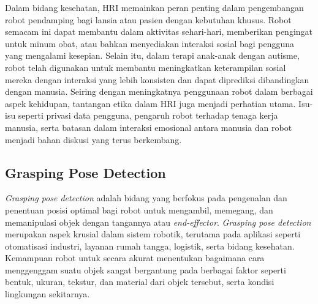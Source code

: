 Dalam bidang kesehatan, HRI memainkan peran penting dalam pengembangan robot pendamping bagi lansia atau pasien dengan kebutuhan khusus.
Robot semacam ini dapat membantu dalam aktivitas sehari-hari, memberikan pengingat untuk minum obat, atau bahkan menyediakan interaksi
sosial bagi pengguna yang mengalami kesepian. Selain itu, dalam terapi anak-anak dengan autisme, robot telah digunakan untuk membantu
meningkatkan keterampilan sosial mereka dengan interaksi yang lebih konsisten dan dapat diprediksi dibandingkan dengan manusia.  
Seiring dengan meningkatnya penggunaan robot dalam berbagai aspek kehidupan, tantangan etika dalam HRI juga menjadi perhatian utama.
Isu-isu seperti privasi data pengguna, pengaruh robot terhadap tenaga kerja manusia, serta batasan dalam interaksi emosional antara
manusia dan robot menjadi bahan diskusi yang terus berkembang.

\subsection{Grasping Pose Detection}

\emph{Grasping pose detection} adalah bidang yang berfokus pada pengenalan dan
penentuan posisi optimal bagi robot untuk mengambil, memegang, dan memanipulasi objek dengan tangannya atau
\emph{end-effector}. \emph{Grasping pose detection} merupakan aspek krusial dalam sistem robotik, terutama
pada aplikasi seperti otomatisasi industri, layanan rumah tangga, logistik, serta bidang kesehatan. Kemampuan
robot untuk secara akurat menentukan bagaimana cara menggenggam suatu objek sangat bergantung pada berbagai
faktor seperti bentuk, ukuran, tekstur, dan material dari objek tersebut, serta kondisi lingkungan sekitarnya\parencite{ZhenXie_lbrgar}.

